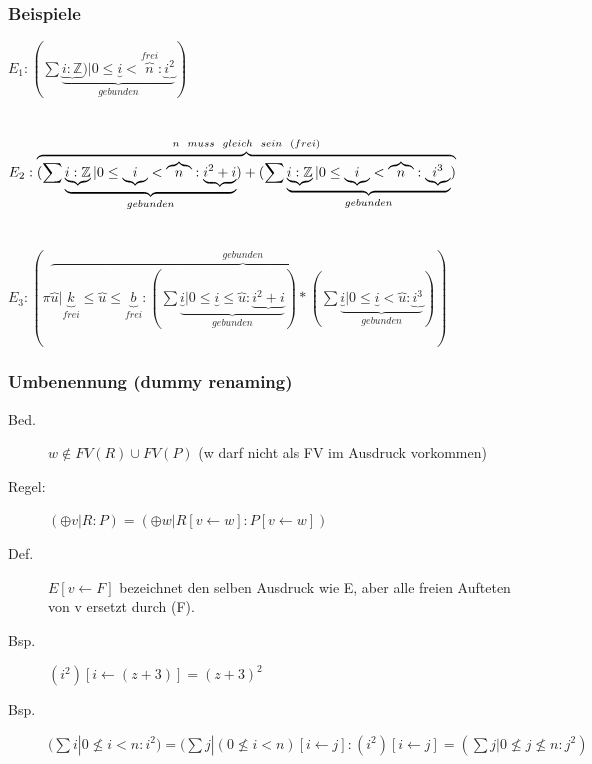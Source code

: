 \documentclass[a4paper,10pt]{article}
\newcommand{\ZN}{\mathbb{Z}} %
\newcommand{\la}{\leftarrow}
\begin{document}
\subsubsection{Beispiele}
$E_1 : (\sum \underbrace{\underbrace{i:\ZN}) | 0 \leq \underbrace{i} < \overbrace{n}^{frei} : \underbrace{i^2}}_{gebunden})$ \\ \\ \\
$E_2 : \overbrace{(\sum \underbrace{\underbrace{i:\ZN} | 0 \leq \underbrace{i} < \overbrace{n} : \underbrace{i^2+i}}_{gebunden}) +(\sum \underbrace{\underbrace{i:\ZN} | 0 \leq \underbrace{i} < \overbrace{n} : \underbrace{i^3}}_{gebunden})}^{n \hspace{2mm}  muss \hspace{2mm} gleich \hspace{2mm} sein \hspace{2mm} (frei)}$ \\ \\ \\
$E_3 :(\pi \overbrace{\overbrace{u} | \underbrace{k}_{frei} \leq \overbrace{u} \leq \underbrace{b}_{frei} : (\sum \underbrace{\underbrace{i} | 0 \leq \underbrace{i} \leq \overbrace{u} : \underbrace{i^2+i}}_{gebunden} )*(\sum \underbrace{\underbrace{i} | 0 \leq \underbrace{i} < \overbrace{u} : \underbrace{i^3}}_{gebunden})}^{gebunden})$

\subsubsection{Umbenennung (dummy renaming)}
\begin{description}
	\item[Bed.] $w \notin FV(R) \cup FV(P)$ (w darf nicht als FV im Ausdruck vorkommen)
	\item[Regel:] $(\oplus v | R : P) = (\oplus w | R[v \la w] : P[v \la w])$
	\item[Def.] $E[v \la F]$ bezeichnet den selben Ausdruck wie E, aber alle freien Aufteten von v ersetzt durch (F).
	\item[Bsp.] $(i^2)[i \la (z+3)] = (z+3)^2$
	\item[Bsp.] $(\sum i | 0 \nleq i < n : i^2) = (\sum j | (0 \nleq i < n)[i \la j] : (i^2)[i \la j] = (\sum j | 0 \nleq j \nleq n : j^2)$
\end{description}
\end{document}

